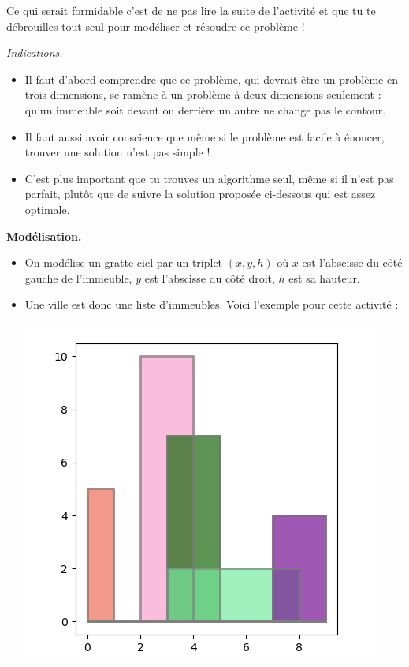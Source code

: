 \documentclass[11pt,class=report,crop=false]{standalone}
\begin{document}
\begin{activite}[Skyline]
\begin{center}
\end{center}

\bigskip

Ce qui serait formidable c'est de ne pas lire la suite de l'activité et que tu te débrouilles tout seul pour modéliser et résoudre ce problème !

\bigskip

\emph{Indications.} 
\begin{itemize}
	\item Il faut d'abord comprendre que ce problème, qui devrait être un problème en trois dimensions, se ramène à un problème à deux dimensions seulement : qu'un immeuble soit devant ou derrière un autre ne change pas le contour.
	
	\item Il faut aussi avoir conscience que même si le problème est facile à énoncer, trouver une solution n'est pas simple !
	
	\item C'est plus important que tu trouves un algorithme seul, même si il n'est pas parfait, plutôt que de suivre la solution proposée ci-dessous qui est assez optimale.
\end{itemize}


\bigskip	
	
\textbf{Modélisation.}

\begin{itemize}
	\item On modélise un gratte-ciel par un triplet $(x,y,h)$ où $x$ est l'abscisse du côté gauche de l'immeuble, $y$ est l'abscisse du côté droit, $h$ est sa hauteur.
	
	
	\item Une ville est donc une liste d'immeubles. Voici l'exemple pour cette activité :
	
	\begin{center}
		\includegraphics[scale=\myscale,scale=0.4]{ecran-skyline-1}\qquad
	\end{center}
	

\end{itemize}
\end{activite}
\end{document}
